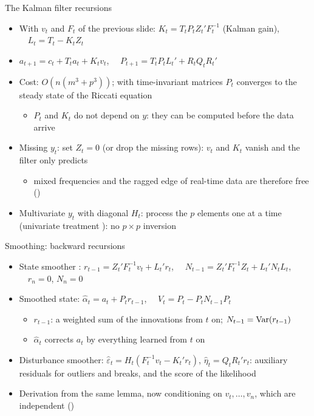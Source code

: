 \begin{frame}{The Kalman filter recursions}
\itemsize{\small}
\begin{itemize}
    \item With $v_t$ and $F_t$ of the previous slide: $K_t = T_tP_tZ_t'F_t^{-1}$ (Kalman gain), $\quad L_t = T_t - K_tZ_t$
    \item $a_{t+1} = c_t + T_ta_t + K_tv_t$, $\quad P_{t+1} = T_tP_tL_t' + R_tQ_tR_t'$
    \item Cost: $O(n(m^3 + p^3))$; with time-invariant matrices $P_t$ converges to the steady state of the Riccati equation
    \begin{itemize}
        \item $P_t$ and $K_t$ do not depend on $y$: they can be computed before the data arrive
    \end{itemize}
    \item Missing $y_t$: set $Z_t = 0$ (or drop the missing rows): $v_t$ and $K_t$ vanish and the filter only predicts
    \begin{itemize}
        \item mixed frequencies and the ragged edge of real-time data are therefore free ()
    \end{itemize}
    \item Multivariate $y_t$ with diagonal $H_t$: process the $p$ elements one at a time (univariate treatment ): no $p\times p$ inversion
\end{itemize}
\end{frame}

\begin{frame}{Smoothing: backward recursions}
\itemsize{\small}
\begin{itemize}
    \item State smoother : $r_{t-1} = Z_t'F_t^{-1}v_t + L_t'r_t$, $\quad N_{t-1} = Z_t'F_t^{-1}Z_t + L_t'N_tL_t$, $\quad r_n = 0$, $N_n = 0$
    \item Smoothed state: $\hat\alpha_t = a_t + P_tr_{t-1}$, $\quad V_t = P_t - P_tN_{t-1}P_t$
    \begin{itemize}
        \item $r_{t-1}$: a weighted sum of the innovations from $t$ on; $N_{t-1} = \text{Var}(r_{t-1})$
        \item $\hat\alpha_t$ corrects $a_t$ by everything learned from $t$ on
    \end{itemize}
    \item Disturbance smoother: $\hat\varepsilon_t = H_t(F_t^{-1}v_t - K_t'r_t)$, $\hat\eta_t = Q_tR_t'r_t$: auxiliary residuals for outliers and breaks, and the score of the likelihood
    \item Derivation from the same lemma, now conditioning on $v_t, \dots, v_n$, which are independent ()  %
\end{itemize}
\end{frame}

